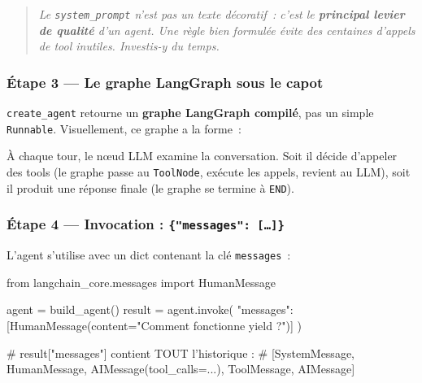 \documentclass[11pt,a4paper]{article}
\begin{document}
\begin{quote}\itshape
Le \texttt{system\_prompt} n'est pas un texte décoratif~: c'est le
\textbf{principal levier de qualité} d'un agent. Une règle bien
formulée évite des centaines d'appels de tool inutiles. Investis-y du
temps.
\end{quote}

\subsubsection*{Étape 3 — Le graphe LangGraph sous le capot}

\texttt{create\_agent} retourne un \textbf{graphe LangGraph compilé}, pas
un simple \texttt{Runnable}. Visuellement, ce graphe a la forme~:

\begin{center}
\end{center}

À chaque tour, le nœud LLM examine la conversation. Soit il décide
d'appeler des tools (le graphe passe au \texttt{ToolNode}, exécute les
appels, revient au LLM), soit il produit une réponse finale (le graphe
se termine à \texttt{END}).

\subsubsection*{Étape 4 — Invocation : \texttt{\{"messages": [\dots]\}}}

L'agent s'utilise avec un dict contenant la clé \texttt{messages}~:

\begin{pythoncode}
from langchain_core.messages import HumanMessage

agent = build_agent()
result = agent.invoke({
    "messages": [HumanMessage(content="Comment fonctionne yield ?")]
})

# result["messages"] contient TOUT l'historique :
# [SystemMessage, HumanMessage, AIMessage(tool_calls=...), ToolMessage, AIMessage]
\end{pythoncode}
\end{document}

